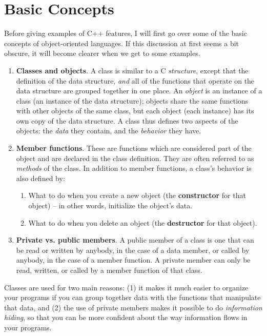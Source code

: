 \section{Basic Concepts}

Before giving examples of C++ features, I will first go over some of
the basic concepts of object-oriented languages.  If this discussion
at first seems a bit obscure, it will become clearer when we get
to some examples.

\begin{enumerate}

\item {\bf Classes and objects}.  A class is similar to a C {\em structure},
except that the definition of the data structure, {\em and} all of the
functions that operate on the data structure are grouped together
in one place.  An {\em object} is an instance of a class (an instance
of the data structure); objects share the same functions with other objects
of the same class, but each object (each instance) has its own copy of
the data structure.  A class thus defines two aspects of the objects:
the {\em data} they contain, and the {\em behavior} they have.

\item {\bf Member functions}.  These are functions which are
considered part of the object and are declared in the class
definition.  They are often referred to as {\em methods} of the class.
In addition to member functions, a class's behavior is also defined
by:
\begin{enumerate}
\item What to do when you create a new object (the {\bf constructor}
for that object) -- in other words, initialize the object's data.
\item What to do when you delete an object (the {\bf destructor} for
that object).
\end{enumerate}

\item {\bf Private vs. public members}.  A public member of a class is
one that can be read or written by anybody, in the case of a data
member, or called by anybody, in the case of a member function.  A
private member can only be read, written, or called by a member
function of that class.
\end{enumerate}

Classes are used for two main reasons: (1) it makes it much easier to
organize your programs if you can group together data with the
functions that manipulate that data, and (2) the use of private
members makes it possible to do {\em information hiding}, so that you
can be more confident about the way information flows in your
programs.

